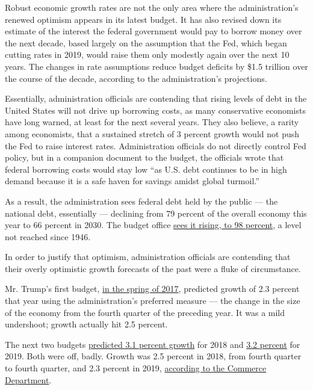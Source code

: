 Robust economic growth rates are not the only area where the
administration's renewed optimism appears in its latest budget. It has
also revised down its estimate of the interest the federal government
would pay to borrow money over the next decade, based largely on the
assumption that the Fed, which began cutting rates in 2019, would raise
them only modestly again over the next 10 years. The changes in rate
assumptions reduce budget deficits by \$1.5 trillion over the course of
the decade, according to the administration's projections.

Essentially, administration officials are contending that rising levels
of debt in the United States will not drive up borrowing costs, as many
conservative economists have long warned, at least for the next several
years. They also believe, a rarity among economists, that a sustained
stretch of 3 percent growth would not push the Fed to raise interest
rates. Administration officials do not directly control Fed policy, but
in a companion document to the budget, the officials wrote that federal
borrowing costs would stay low ``as U.S. debt continues to be in high
demand because it is a safe haven for savings amidst global turmoil.''

As a result, the administration sees federal debt held by the public ---
the national debt, essentially --- declining from 79 percent of the
overall economy this year to 66 percent in 2030. The budget office
\href{https://www.cbo.gov/publication/56073}{sees it rising, to 98
percent}, a level not reached since 1946.

In order to justify that optimism, administration officials are
contending that their overly optimistic growth forecasts of the past
were a fluke of circumstance.

Mr. Trump's first budget,
\href{https://www.govinfo.gov/content/pkg/BUDGET-2018-BUD/pdf/BUDGET-2018-BUD.pdf}{in
the spring of 2017}, predicted growth of 2.3 percent that year using the
administration's preferred measure --- the change in the size of the
economy from the fourth quarter of the preceding year. It was a mild
undershoot; growth actually hit 2.5 percent.

The next two budgets
\href{https://www.whitehouse.gov/wp-content/uploads/2018/02/budget-fy2019.pdf}{predicted
3.1 percent growth} for 2018 and
\href{https://www.whitehouse.gov/wp-content/uploads/2019/03/budget-fy2020.pdf}{3.2
percent} for 2019. Both were off, badly. Growth was 2.5 percent in 2018,
from fourth quarter to fourth quarter, and 2.3 percent in 2019,
\href{https://www.bea.gov/news/2020/gross-domestic-product-fourth-quarter-and-year-2019-advance-estimate}{according
to the Commerce Department}.

